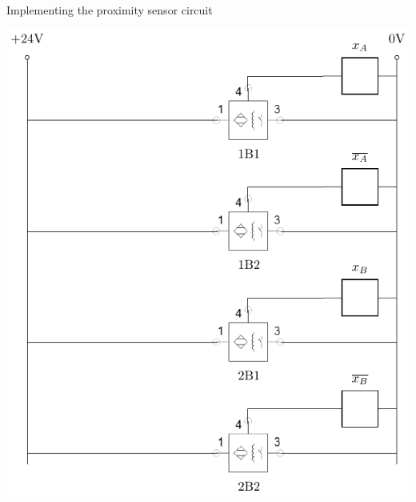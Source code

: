 \documentclass[presentation,aspectratio=1610]{beamer}
\begin{document}
\begin{frame}[label={sec:org163444c}]{Implementing the proximity sensor circuit}
\begin{center}
\includegraphics[height=0.9\textheight]{sensor-circuit}
\end{center}
\end{frame}
\end{document}
